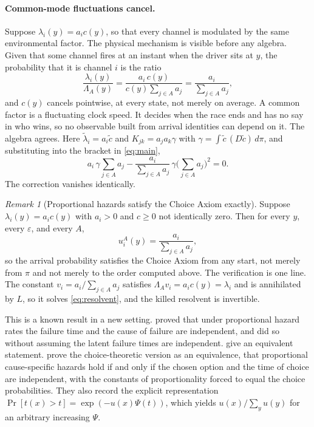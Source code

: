 \documentclass[11pt]{article}
\theoremstyle{remark}
\newtheorem{remark}{Remark}
\begin{document}
\paragraph{Common-mode fluctuations cancel.} Suppose
$\lambda_i(y) = a_i c(y)$, so that every channel is modulated by the same
environmental factor. The physical mechanism is visible before any algebra.
Given that some channel fires at an instant when the driver sits at $y$, the
probability that it is channel $i$ is the ratio
\[
  \frac{\lambda_i(y)}{\Lambda_A(y)}
  = \frac{a_i\, c(y)}{c(y) \sum_{j\in A} a_j}
  = \frac{a_i}{\sum_{j\in A} a_j} ,
\]
and $c(y)$ cancels pointwise, at every state, not merely on average. A common
factor is a fluctuating clock speed. It decides when the race ends and has no
say in who wins, so no observable built from arrival identities can depend on
it. The algebra agrees. Here $\tilde\lambda_i = a_i \tilde{c}$ and
$K_{jk} = a_j a_k \gamma$ with $\gamma = \int \tilde c \, (D\tilde c)\, d\pi$,
and substituting into the bracket in \eqref{eq:main},
\[
  a_i\, \gamma \sum_{j\in A} a_j
  - \frac{a_i}{\sum_{j\in A}a_j}\, \gamma \Big(\sum_{j\in A}a_j\Big)^{2}
  = 0 .
\]
The correction vanishes identically.

\begin{remark}[Proportional hazards satisfy the Choice Axiom
exactly]\label{rem:common}
Suppose $\lambda_i(y) = a_i c(y)$ with $a_i > 0$ and $c \ge 0$ not identically
zero. Then for every $y$, every $\varepsilon$, and every $A$,
\[
  u_i^A(y) = \frac{a_i}{\sum_{j \in A} a_j} ,
\]
so the arrival probability satisfies the Choice Axiom from any start, not
merely from $\pi$ and not merely to the order computed above. The
verification is one line. The constant $v_i = a_i/\sum_{j\in A}a_j$
satisfies $\Lambda_A v_i = a_i c(y) = \lambda_i$ and is annihilated by $L$,
so it solves \eqref{eq:resolvent}, and the killed resolvent is invertible.
\end{remark}

This is a known result in a new setting. \citet{elandt1976} proved that under
proportional hazard rates the failure time and the cause of failure are
independent, and did so without assuming the latent failure times are
independent. \citet{kochar1991} give an equivalent statement.
\citet{marley1992} prove the choice-theoretic version as an equivalence, that
proportional cause-specific hazards hold if and only if the chosen option and
the time of choice are independent, with the constants of proportionality
forced to equal the choice probabilities. They also record the explicit
representation $\Pr[t(x) > t] = \exp(-u(x)\Psi(t))$, which yields
$u(x)/\sum_y u(y)$ for an arbitrary increasing $\Psi$.
\end{document}
